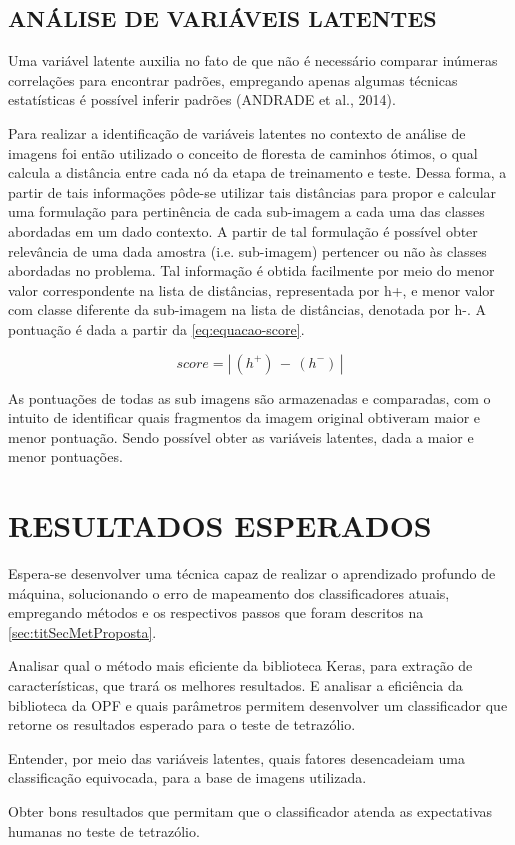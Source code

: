 \subsection{ANÁLISE DE VARIÁVEIS LATENTES}
\label{sec:titSubSecVarLatentes}

Uma variável latente auxilia no fato de que não é necessário comparar inúmeras correlações para encontrar padrões, empregando apenas algumas técnicas estatísticas é possível inferir padrões (ANDRADE et al., 2014).

Para realizar a identificação de variáveis latentes no contexto de análise de imagens foi então utilizado o conceito de floresta de caminhos ótimos, o qual calcula a distância entre cada nó da etapa de treinamento e teste. Dessa forma, a partir de tais informações pôde-se utilizar tais distâncias para propor e calcular uma formulação para pertinência de cada sub-imagem a cada uma das classes abordadas em um dado contexto. A partir de tal formulação é possível obter relevância de uma dada amostra (i.e. sub-imagem) pertencer ou não às classes abordadas no problema. Tal informação é obtida facilmente por meio do menor valor correspondente na lista de distâncias, representada por h+, e menor valor com classe diferente da sub-imagem na lista de distâncias, denotada por h-. A pontuação é dada a partir da \autoref{eq:equacao-score}.

\begin{equation}
    score = |\, ({h}^{+}) \, - \, ({h}^{-}) \, |
    \label{eq:equacao-score}
\end{equation}

As pontuações de todas as sub imagens são armazenadas e comparadas, com o intuito de identificar quais fragmentos da imagem original obtiveram maior e menor pontuação. Sendo possível obter as variáveis latentes, dada a maior e menor pontuações.

\section{RESULTADOS ESPERADOS}
\label{sec:titSecResultEsperados}

Espera-se desenvolver uma técnica capaz de realizar o aprendizado
profundo de máquina, solucionando o erro de mapeamento dos classificadores atuais, empregando métodos e os respectivos passos que foram descritos na \autoref{sec:titSecMetProposta}.

Analisar qual o método mais eficiente da biblioteca Keras, para extração de características, que trará os melhores resultados. E analisar a eficiência da biblioteca da OPF e quais parâmetros permitem desenvolver um classificador que retorne os resultados esperado para o teste de tetrazólio.

Entender, por meio das variáveis latentes, quais fatores desencadeiam uma classificação equivocada, para a base de imagens utilizada.

Obter bons resultados que permitam que o classificador atenda as expectativas humanas no teste de tetrazólio.

